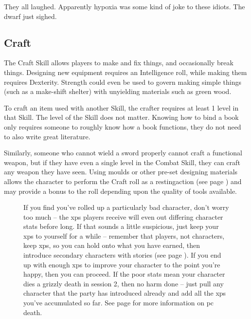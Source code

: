 \begin{multicols}{2}
\begin{exampletext}
  They all laughed.
  Apparently hypoxia was some kind of joke to these idiots.
  The dwarf just sighed.
  
\end{exampletext}

\subsection{Craft}

The Craft Skill allows players to make and fix things, and occasionally break things.
Designing new equipment requires an Intelligence roll, while making them requires Dexterity.
Strength could even be used to govern making simple things (such as a make-shift shelter) with unyielding materials such as green wood.

To craft an item used with another Skill, the crafter requires at least 1 level in that Skill.
The level of the Skill does not matter.
Knowing how to bind a book only requires someone to roughly know how a book functions, they do not need to also write great literature.

Similarly, someone who cannot wield a sword properly cannot craft a functional weapon, but if they have even a single level in the Combat Skill, they can craft any weapon they have seen.
Using moulds or other pre-set designing materials allows the character to perform the Craft roll as a \gls{restingaction} (see page \pageref{restingactions}) and may provide a bonus to the roll depending upon the quality of tools available.

\begin{figure*}[b!]
  \begin{boxtext}[title=Rolling with Bad Stats]

    If you find you've rolled up a particularly bad character, don't worry too much -- the \glspl{xp} players receive will even out differing character stats before long.
    If that sounds a little suspicious, just keep your \glspl{xp} to yourself for a while -- remember that players, not characters, keep \glspl{xp}, so you can hold onto what you have earned, then introduce secondary characters with stories (see page \pageref{stories}).
    If you end up with enough \glspl{xp} to improve your character to the point you're happy, then you can proceed.
    If the poor stats mean your character dies a grizzly death in session 2, then no harm done -- just pull any character that the party has introduced already and add all the \glspl{xp} you've accumulated so far.
    See page \pageref{pcdeath} for more information on \gls{pc} death.


\end{boxtext}
\end{figure*}
\end{multicols}
